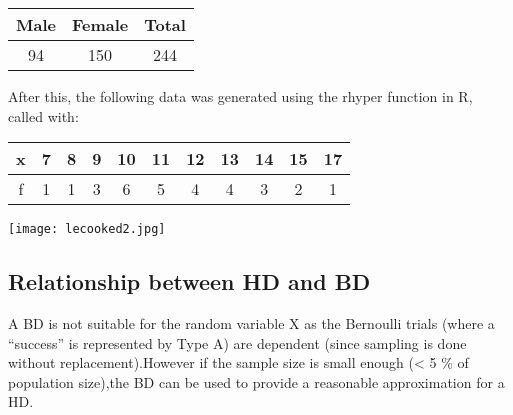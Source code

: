 \documentclass{article}
\begin{document}
\begin{center}
  \begin{tabular}{|c|c|c|}
    \hline
    \textbf{Male} & \textbf{Female} & \textbf{Total} \\
    \hline
    \hline
    94 & 150 & 244 \\
    \hline
  \end{tabular}
\end{center}


After this, the following data was generated using the rhyper
function in R, called with:

\begin{center}
  \begin{tabular}{|c|c|c|c|c|c|c|c|c|c|c|}
    \hline
    x & 7 & 8 & 9 & 10 & 11 & 12 & 13 & 14 & 15 & 17 \\
    \hline
    f & 1 & 1 & 3 & 6 & 5 & 4 & 4 & 3 & 2 & 1 \\
    \hline
  \end{tabular}
\end{center}

\begin{center}
  \texttt{[image: lecooked2.jpg]}
\end{center}

\subsection{Relationship between HD and BD}
A BD is not suitable for the random variable X as the Bernoulli trials
(where a “success” is represented by Type A) are dependent 
(since sampling is done without replacement).However if the sample 
size is small enough (< 5 \% of population size),the BD can be used 
to provide a reasonable approximation for a HD.
\end{document}
